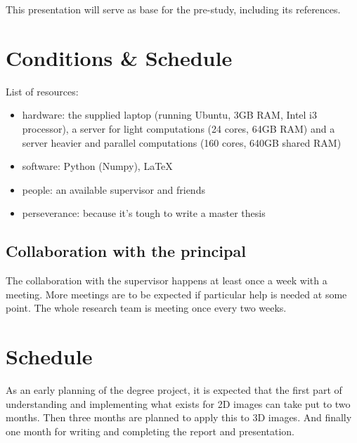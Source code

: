 \documentclass[12pt]{article}
\begin{document}
This presentation \cite{siam_slides_2016} will serve as base for the pre-study, including its references.

\section*{Conditions \& Schedule}

List of resources: \\
\begin{itemize}
 \item hardware: the supplied laptop (running Ubuntu, 3GB RAM, Intel i3 processor), a server for light computations (24 cores, 64GB RAM) and a server heavier and parallel computations (160 cores, 640GB shared RAM)
 \item software: Python (Numpy), \LaTeX
 \item people: an available supervisor and friends
 \item perseverance: because it's tough to write a master thesis
\end{itemize}

\subsection*{Collaboration with the principal}

The collaboration with the supervisor happens at least once a week with a meeting.
More meetings are to be expected if particular help is needed at some point.
The whole research team is meeting once every two weeks.

\section*{Schedule}

As an early planning of the degree project, it is expected that the first part of understanding and implementing what exists for 2D images can take put to two months.
Then three months are planned to apply this to 3D images.
And finally one month for writing and completing the report and presentation.



\printbibliography
\end{document}
